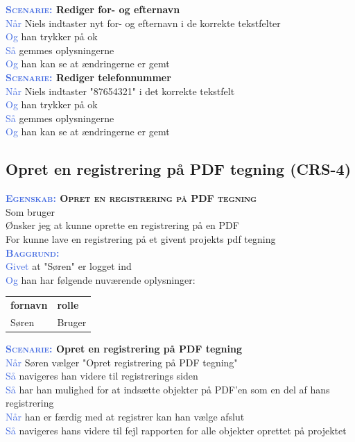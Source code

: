 \textbf{\textsc{\textcolor{RoyalBlue}{Scenarie:}} Rediger for- og efternavn}\\
\textcolor{RoyalBlue}{Når} Niels indtaster nyt for- og efternavn i de korrekte tekstfelter\\
\textcolor{RoyalBlue}{Og} han trykker på ok\\
\textcolor{RoyalBlue}{Så} gemmes oplysningerne\\
\textcolor{RoyalBlue}{Og} han kan se at ændringerne er gemt \\

\textbf{\textsc{\textcolor{RoyalBlue}{Scenarie:}} Rediger telefonnummer}\\
\textcolor{RoyalBlue}{Når} Niels indtaster "87654321" i det korrekte tekstfelt\\
\textcolor{RoyalBlue}{Og} han trykker på ok\\
\textcolor{RoyalBlue}{Så} gemmes oplysningerne\\
\textcolor{RoyalBlue}{Og} han kan se at ændringerne er gemt \\

\subsection{Opret en registrering på PDF tegning (CRS-4)} \label{sec:USOpretRegPåPDF}
\textbf{\textsc{\textcolor{RoyalBlue}{Egenskab:} Opret en registrering på PDF tegning}}\\
Som bruger\\
Ønsker jeg at kunne oprette en registrering på en PDF\\
For kunne lave en registrering på et givent projekts pdf tegning \\

\textsc{\textcolor{RoyalBlue}{\textbf{Baggrund:}}}\\
\textcolor{RoyalBlue}{Givet} at "Søren" er logget ind\\
\textcolor{RoyalBlue}{Og} han har følgende nuværende oplysninger:\\
\begin{tabular}{| l | l |}
	\textbf{fornavn} & \textbf{rolle} \\
	Søren & Bruger\\
\end{tabular}

\textbf{\textsc{\textcolor{RoyalBlue}{Scenarie:}} Opret en registrering på PDF tegning}\\
\textcolor{RoyalBlue}{Når} Søren vælger "Opret registrering på PDF tegning"\\
\textcolor{RoyalBlue}{Så}  navigeres han videre til registrerings siden\\
\textcolor{RoyalBlue}{Så}  har han mulighed for at indsætte objekter på PDF'en som en del af hans registrering\\
\textcolor{RoyalBlue}{Når} han er færdig med at registrer kan han vælge afslut \\
\textcolor{RoyalBlue}{Så}  navigeres hans videre til fejl rapporten for alle objekter oprettet på projektet \\


